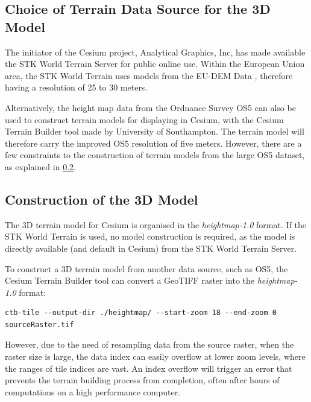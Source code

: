 \documentclass[11pt, oneside]{article}
\begin{document}
	\subsection{Choice of Terrain Data Source for the 3D Model}
	
	 	The initiator of the Cesium project, Analytical Graphics, Inc, has made available the STK World Terrain Server \cite{stk-world-terrain} for public online use. Within the European Union area, the STK World Terrain uses models from the EU-DEM Data \cite{eu-dem}, therefore having a resolution of 25 to 30 meters. 
		
		Alternatively, the height map data from the Ordnance Survey OS5 \cite{os-5} can also be used to construct terrain models for displaying in Cesium, with the Cesium Terrain Builder \cite{cesium-terrain-builder} tool made by University of Southampton. The terrain model will therefore carry the improved OS5 resolution of five meters. However, there are a few constraints to the construction of terrain models from the large OS5 dataset, as explained in \ref{subsec:construction}.
		
	\subsection{Construction of the 3D Model} \label{subsec:construction}
		
		The 3D terrain model for Cesium is organised in the \textit{heightmap-1.0}\cite{heightmap} format. If the STK World Terrain is used, no model construction is required, as the model is directly available (and default in Cesium) from the STK World Terrain Server. 
		
		To construct a 3D terrain model from another data source, such as OS5, the Cesium Terrain Builder \cite{cesium-terrain-builder} tool can convert a GeoTIFF raster into the \textit{heightmap-1.0} format:
		\begin{lstlisting}[breaklines]
ctb-tile --output-dir ./heightmap/ --start-zoom 18 --end-zoom 0 sourceRaster.tif
		\end{lstlisting}
		
		However, due to the need of resampling data from the source raster, when the raster size is large, the data index can easily overflow at lower zoom levels, where the ranges of tile indices are vast.  An index overflow will trigger an error that prevents the terrain building process from completion, often after hours of computations on a high performance computer. 
		
\end{document}
